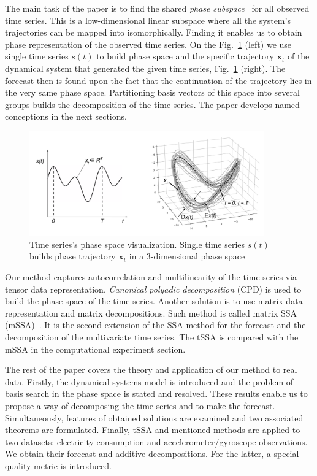 \documentclass[referee, pdflatex, sn-mathphys-num]{sn-jnl}
\theoremstyle{definition}
\theoremstyle{plain}
\begin{document}
	The main task of the paper is to find the shared \emph{phase subspace}~\cite{1572261550523548160, ignatov2016human} for all observed time series. This is a low-dimensional linear subspace where all the system's trajectories can be mapped into isomorphically. Finding it enables us to obtain phase representation of the observed time series. On the Fig.~\ref{pic:phase_traj} (left) we use single time series $ s(t) $ to build phase space and the specific trajectory $ \mathbf{x}_t $ of the dynamical system that generated the given time series, Fig.~\ref{pic:phase_traj} (right). The forecast then is found upon the fact that the continuation of the trajectory lies in the very same phase space. Partitioning basis vectors of this space into several groups builds the decomposition of the time series. The paper develops named conceptions in the next sections.
	
	\begin{figure}[!htbp]
		\centering
		\includegraphics[width=0.9\textwidth, keepaspectratio]{phase_traj.png}
		\caption{Time series's phase space visualization. Single time series $ s(t) $ builds phase trajectory $ \mathbf{x}_t $ in a 3-dimensional phase space}\label{pic:phase_traj}
	\end{figure}
	
	Our method captures autocorrelation and multilinearity of the time series via tensor data representation. \emph{Canonical polyadic decomposition} (CPD) is used to build the phase space of the time series. Another solution is to use matrix data representation and matrix decompositions. Such method is called matrix SSA (mSSA)~\cite{mSSA_overview}. It is the second extension of the SSA method for the forecast and the decomposition of the multivariate time series. The tSSA is compared with the mSSA in the computational experiment section.
	
	The rest of the paper covers the theory and application of our method to real data. Firstly, the dynamical systems model is introduced and the problem of basis search in the phase space is stated and resolved. These results enable us to propose a way of decomposing the time series and to make the forecast. Simultaneously, features of obtained solutions are examined and two associated theorems are formulated. Finally, tSSA and mentioned methods are applied to two datasets: electricity consumption and accelerometer/gyroscope observations. We obtain their forecast and additive decompositions. For the latter, a special quality metric is introduced.
	
\end{document}

